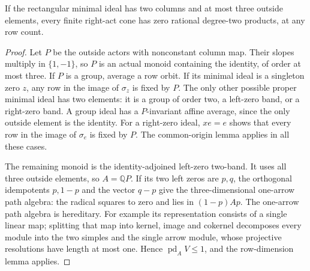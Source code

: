 \begin{proposition}
\label{CP2:A-three-outside-two-column-acts}
If the rectangular minimal ideal has two columns and at
most three outside elements, every finite right-act cone
has zero rational degree-two products, at any row count.
\end{proposition}
\begin{proof}
Let $P$ be the outside actors with nonconstant column
map. Their slopes multiply in $\{1,-1\}$, so $P$ is
an actual monoid containing the identity, of order at
most three. If $P$ is a group, average a row orbit.
If its minimal ideal is a singleton zero $z$, any row
in the image of $\sigma_z$ is fixed by $P$. The only
other possible proper minimal ideal has two elements:
it is a group of order two, a left-zero band, or a
right-zero band. A group ideal has a $P$-invariant
affine average, since the only outside element is the
identity. For a right-zero ideal, $xe=e$ shows that
every row in the image of $\sigma_e$ is fixed by $P$.
The common-origin lemma applies in all these cases.

The remaining monoid is the identity-adjoined left-zero
two-band. It uses all three outside elements, so
$A=\mathbb QP$. If its two left zeros are $p,q$, the
orthogonal idempotents $p,1-p$ and the vector $q-p$
give the three-dimensional one-arrow path algebra:
the radical squares to zero and lies in $(1-p)Ap$.
The one-arrow path algebra is hereditary. For example
its representation consists of a single linear map;
splitting that map into kernel, image and cokernel
decomposes every module into the two simples and the
single arrow module, whose projective resolutions have
length at most one. Hence $\operatorname{pd}_A V\leq1$,
and the row-dimension lemma applies.
\end{proof}

